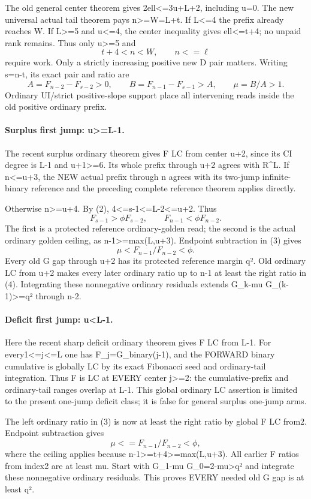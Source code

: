 The old general center theorem gives 2ell<=3u+L+2, including u=0.
The new universal actual tail theorem pays n>=W=L+t.
If L<=4 the prefix already reaches W. If L>=5 and u<=4,
the center inequality gives ell<=t+4; no unpaid rank remains.
Thus only u>=5 and
\[
                     t+4<n<W,\qquad n<=\ell              \tag{2}
\]
require work. Only a strictly increasing positive new D pair matters.
Writing s=n-t, its exact pair and ratio are
\[
 A=F_{n-2}-F_{s-2}>0,\qquad
 B=F_{n-1}-F_{s-1}>A,\qquad \mu=B/A>1.                  \tag{3}
\]
Ordinary UI/strict positive-slope support place all intervening
reads inside the old positive ordinary prefix.

\paragraph{Surplus first jump: u>=L-1.}
The recent surplus ordinary theorem gives F LC from center u+2,
since its CI degree is L-1 and u+1>=6. Its whole prefix through
u+2 agrees with R^L. If n<=u+3, the NEW actual prefix through n
agrees with its two-jump infinite-binary reference and the preceding
complete reference theorem applies directly.

Otherwise n>=u+4. By (2), 4<=s-1<=L-2<=u+2. Thus
\[
 F_{s-1}>\phi F_{s-2},\qquad
 F_{n-1}<\phi F_{n-2}.
\]
The first is a protected reference ordinary-golden read; the second
is the actual ordinary golden ceiling, as n-1>=max(L,u+3).
Endpoint subtraction in (3) gives
\[
                         \mu<F_{n-1}/F_{n-2}<\phi.       \tag{4}
\]
Every old G gap through u+2 has its protected reference margin q².
Old ordinary LC from u+2 makes every later ordinary ratio up to
n-1 at least the right ratio in (4). Integrating these nonnegative
ordinary residuals extends G_k-mu G_(k-1)>=q² through n-2.

\paragraph{Deficit first jump: u<L-1.}
Here the recent sharp deficit ordinary theorem gives F LC from L-1.
For every1<=j<=L one has F_j=G_binary(j-1), and the FORWARD
binary cumulative is globally LC by its exact Fibonacci seed and
ordinary-tail integration. Thus F is LC at EVERY center j>=2:
the cumulative-prefix and ordinary-tail ranges overlap at L-1.
This global ordinary LC assertion is limited to the present one-jump
deficit class; it is false for general surplus one-jump arms.

The left ordinary ratio in (3) is now at least the right ratio by
global F LC from2. Endpoint subtraction gives
\[
                      \mu<=F_{n-1}/F_{n-2}<\phi,          \tag{5}
\]
where the ceiling applies because n-1>=t+4>=max(L,u+3).
All earlier F ratios from index2 are at least mu. Start with
G_1-mu G_0=2-mu>q² and integrate these nonnegative ordinary
residuals. This proves EVERY needed old G gap is at least q².

